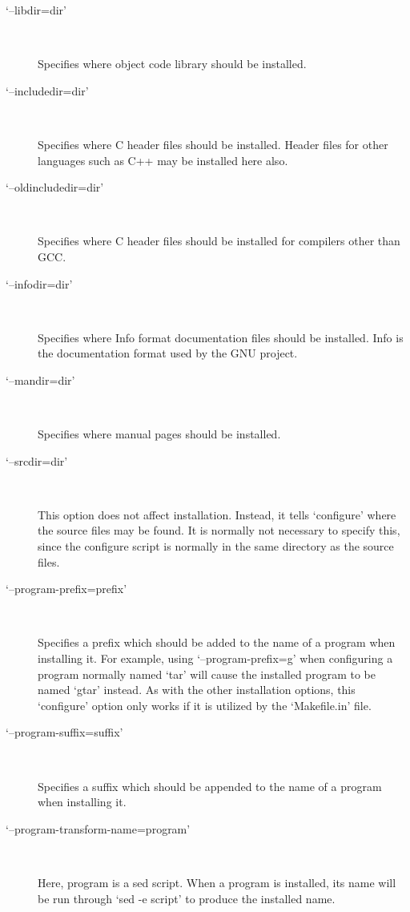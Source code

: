 \begin{description}
\item[`--libdir=dir']
\ %

Specifies where object code library should be installed. 

\item[`--includedir=dir']
\ %

Specifies where C header files should be installed. Header files for other languages such as C++ may be installed here also. 

\item[`--oldincludedir=dir']
\ %

Specifies where C header files should be installed for compilers other than GCC. 

\item[`--infodir=dir']
\ %

Specifies where Info format documentation files should be installed. Info is the documentation format used by the GNU project. 

\item[`--mandir=dir']
\ %

Specifies where manual pages should be installed. 

\item[`--srcdir=dir']
\ %

This option does not affect installation. Instead, it tells `configure' where the source files may be found. It is normally not necessary to specify this, since the configure script is normally in the same directory as the source files. 

\item[`--program-prefix=prefix']
\ %

Specifies a prefix which should be added to the name of a program when installing it. For example, using `--program-prefix=g' when configuring a program normally named `tar' will cause the installed program to be named `gtar' instead. As with the other installation options, this `configure' option only works if it is utilized by the `Makefile.in' file. 

\item[`--program-suffix=suffix']
\ %

Specifies a suffix which should be appended to the name of a program when installing it. 

\item[`--program-transform-name=program']
\ %

Here, program is a sed script. When a program is installed, its name will be run through `sed -e script' to produce the installed name. 


\end{description}
